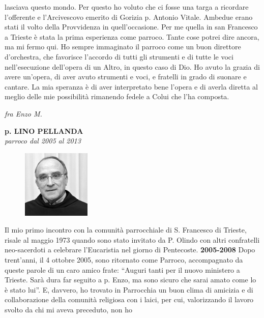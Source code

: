 lasciava questo mondo. Per questo ho voluto che ci fosse una targa a ricordare l’offerente e 
l’Arcivescovo emerito di Gorizia p. Antonio Vitale. Ambedue erano stati il volto della 
Provvidenza in quell’occasione.
\medbreak
Per me quella in san Francesco a Trieste è stata la prima esperienza come parroco. Tante cose 
potrei dire ancora, ma mi fermo qui. Ho sempre immaginato il parroco come un buon direttore 
d’orchestra, che favorisce l’accordo di tutti gli strumenti e di tutte le voci nell’esecuzione 
dell’opera di un Altro, in questo caso di Dio. Ho avuto la grazia di avere un’opera, di aver avuto 
strumenti e voci, e fratelli in grado di suonare e cantare. La mia speranza è di aver interpretato 
bene l’opera e di averla diretta al meglio delle mie possibilità rimanendo fedele a Colui che l’ha 
composta.
\begin{flushright}
\textit{fra Enzo M.}
\end{flushright}
\endgroup
\newpage
\begin{center}
\textbf{\Large p. LINO PELLANDA}\\
	\textit{parroco dal 2005 al 2013}
\end{center}
\bigbreak
\begingroup
\setlength\intextsep{0pt}
\begin{figure}
\centering
\includegraphics[width=0.29\textwidth]{immagini/lino.jpg}
\end{figure}
\noindent Il mio primo incontro con la comunità parrocchiale di S. Francesco di Trieste, risale al 
maggio 1973 quando sono stato invitato da P. Olindo con altri confratelli neo-sacerdoti a celebrare 
l'Eucaristia nel giorno di Pentecoste.
\bigbreak
\noindent \textbf{2005-2008}
\medbreak
\noindent Dopo trent'anni, il 4 ottobre 2005, sono ritornato come Parroco, accompagnato da queste 
parole di un caro amico frate: ``Auguri tanti per il nuovo ministero a Trieste. Sarà dura far seguito a 
p. Enzo, ma sono sicuro che sarai amato come lo è stato lui''.
E, davvero, ho trovato in Parrocchia un buon clima di amicizia e di collaborazione della comunità 
religiosa con i laici, per cui, valorizzando il lavoro svolto da chi mi aveva preceduto, non ho 
